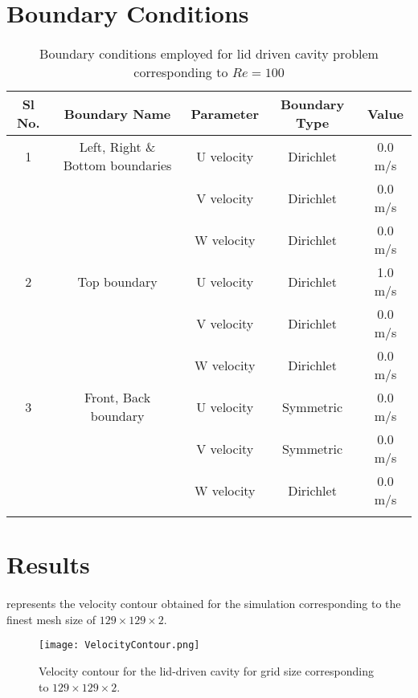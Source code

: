 \section*{Boundary Conditions}
\begin{longtable}[htb!]{||c|c|c|c|c||} \hline
	\centering
		Sl No. &Boundary Name& Parameter & Boundary Type & Value \\ \hline
		
		1 &Left, Right \&  Bottom  boundaries & U velocity & Dirichlet & 0.0 m/s \\
			& 							 & V velocity & Dirichlet & 0.0 m/s\\
			& 							 & W velocity & Dirichlet & 0.0 m/s\\			\hline	
		2 & Top boundary & U velocity & Dirichlet & 1.0 m/s \\
			& 							 & V velocity & Dirichlet & 0.0 m/s\\
			& 							 & W velocity & Dirichlet & 0.0 m/s\\			\hline				
	  3   & Front, Back boundary & U velocity & Symmetric & 0.0 m/s \\
		   & 							 & V velocity & Symmetric & 0.0 m/s\\
		   & 							 & W velocity & Dirichlet & 0.0 m/s\\			\hline
   \caption{Boundary conditions employed for lid driven cavity problem corresponding to $Re=100$ }
\end{longtable}

\section{Results}
   \paragraph*{}
     represents the velocity contour obtained for the simulation corresponding to the finest mesh size of $129 \times 129 \times 2$.
   
   \begin{figure}[htb!]
	\centering
	\hspace*{-2.5cm}
	\texttt{[image: VelocityContour.png]}
	\caption{Velocity contour for the lid-driven cavity for grid size corresponding to $129 \times 129 \times 2$.}
	\label{fig:VelocityContourLDC}
  \end{figure}

